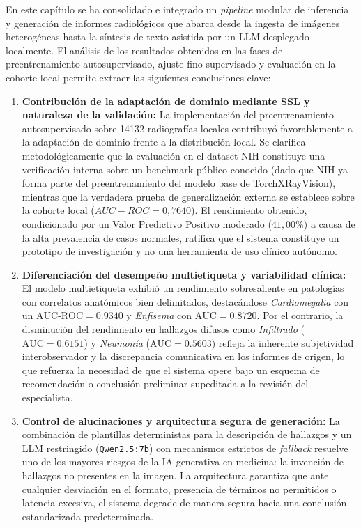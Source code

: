 \documentclass[../main.tex]{subfiles}
\begin{document}
En este capítulo se ha consolidado e integrado un \textit{pipeline} modular de inferencia y generación de informes radiológicos que abarca desde la ingesta de imágenes heterogéneas hasta la síntesis de texto asistida por un LLM desplegado localmente. El análisis de los resultados obtenidos en las fases de preentrenamiento autosupervisado, ajuste fino supervisado y evaluación en la cohorte local permite extraer las siguientes conclusiones clave:

\begin{enumerate}
    \item \textbf{Contribución de la adaptación de dominio mediante SSL y naturaleza de la validación:} La implementación del preentrenamiento autosupervisado sobre 14132 radiografías locales contribuyó favorablemente a la adaptación de dominio frente a la distribución local. Se clarifica metodológicamente que la evaluación en el dataset NIH constituye una verificación interna sobre un benchmark público conocido (dado que NIH ya forma parte del preentrenamiento del modelo base de TorchXRayVision), mientras que la verdadera prueba de generalización externa se establece sobre la cohorte local ($AUC-ROC = 0{,}7640$). El rendimiento obtenido, condicionado por un Valor Predictivo Positivo moderado ($41{,}00\%$) a causa de la alta prevalencia de casos normales, ratifica que el sistema constituye un prototipo de investigación y no una herramienta de uso clínico autónomo.

    \item \textbf{Diferenciación del desempeño multietiqueta y variabilidad clínica:} El modelo multietiqueta exhibió un rendimiento sobresaliente en patologías con correlatos anatómicos bien delimitados, destacándose \textit{Cardiomegalia} con un $\text{AUC-ROC} = 0.9340$ y \textit{Enfisema} con $\text{AUC} = 0.8720$. Por el contrario, la disminución del rendimiento en hallazgos difusos como \textit{Infiltrado} ($\text{AUC} = 0.6151$) y \textit{Neumonía} ($\text{AUC} = 0.5603$) refleja la inherente subjetividad interobservador y la discrepancia comunicativa en los informes de origen, lo que refuerza la necesidad de que el sistema opere bajo un esquema de recomendación o conclusión preliminar supeditada a la revisión del especialista.

    \item \textbf{Control de alucinaciones y arquitectura segura de generación:} La combinación de plantillas deterministas para la descripción de hallazgos y un LLM restringido (\texttt{Qwen2.5:7b}) con mecanismos estrictos de \textit{fallback} resuelve uno de los mayores riesgos de la IA generativa en medicina: la invención de hallazgos no presentes en la imagen. La arquitectura garantiza que ante cualquier desviación en el formato, presencia de términos no permitidos o latencia excesiva, el sistema degrade de manera segura hacia una conclusión estandarizada predeterminada.


\end{enumerate}
\end{document}
